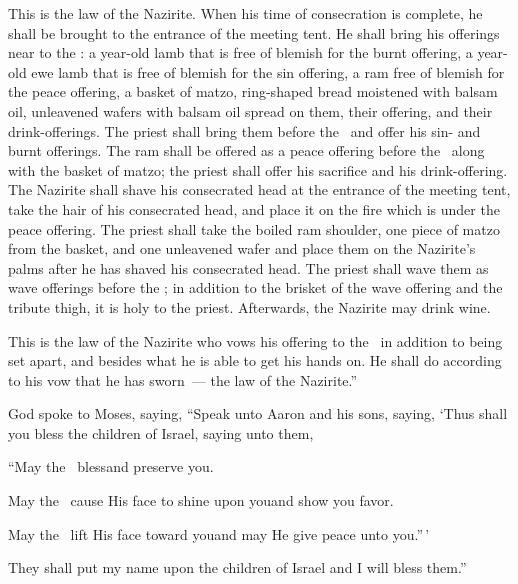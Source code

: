 \begin{inparaenum}
   This is the law of the Nazirite. When his time of consecration is complete, he shall be brought to the entrance of the meeting tent.%
   He shall bring his offerings near to the \lord: a year-old lamb that is free of blemish for the burnt offering, a year-old ewe lamb that is free of blemish for the sin offering, a ram free of blemish for the peace offering,%
   a basket of matzo, ring-shaped bread moistened with balsam oil, unleavened wafers with balsam oil spread on them, their offering, and their drink-offerings.%
   The priest shall bring them before the \lord\ and offer his sin- and burnt offerings.%
   The ram shall be offered as a peace offering before the \lord\ along with the basket of matzo; the priest shall offer his sacrifice and his drink-offering.%
   The Nazirite shall shave his consecrated head at the entrance of the meeting tent, take the hair of his consecrated head, and place it on the fire which is under the peace offering.%
   The priest shall take the boiled ram shoulder, one piece of matzo from the basket, and one unleavened wafer and place them on the Nazirite's palms after he has shaved his consecrated head.%
   The priest shall wave them as wave offerings before the \lord; in addition to the brisket of the wave offering and the tribute thigh, it is holy to the priest. Afterwards, the Nazirite may drink wine.%
  
   This is the law of the Nazirite who vows his offering to the \lord\ in addition to being set apart, and besides what he is able to get his hands on. He shall do according to his vow that he has sworn~--- the law of the Nazirite.''%
  
   God spoke to Moses, saying,%
   ``Speak unto Aaron and his sons, saying, `Thus shall you bless the children of Israel, saying unto them,\smallskip%
  
  \pc {} ``May the \lord\ bless\pa and preserve you.%
  
  \pc {} May the \lord\ cause His face to shine upon you\pa and show you favor.%
  
  \pc {} May the \lord\ lift His face toward you\pa and may He give peace unto you.''\,'\smallskip%
  
   They shall put my name upon the children of Israel and I will bless them.''%
\end{inparaenum}
